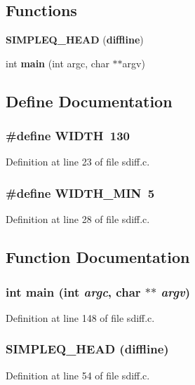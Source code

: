 \subsection*{Functions}
\begin{DoxyCompactItemize}
\item 
{\bf SIMPLEQ\_\-HEAD} ({\bf diffline})
\item 
int {\bf main} (int argc, char $\ast$$\ast$argv)
\end{DoxyCompactItemize}


\subsection{Define Documentation}
\subsubsection[{WIDTH}]{\setlength{\rightskip}{0pt plus 5cm}\#define WIDTH~130}\label{sdiff_8c_a241aeeb764887ae5e3de58b98f04b16d}


Definition at line 23 of file sdiff.c.

\subsubsection[{WIDTH\_\-MIN}]{\setlength{\rightskip}{0pt plus 5cm}\#define WIDTH\_\-MIN~5}\label{sdiff_8c_a54b8a4e8ef50fc50e77a641d62133a26}


Definition at line 28 of file sdiff.c.



\subsection{Function Documentation}
\subsubsection[{main}]{\setlength{\rightskip}{0pt plus 5cm}int main (int {\em argc}, \/  char $\ast$$\ast$ {\em argv})}\label{sdiff_8c_a3c04138a5bfe5d72780bb7e82a18e627}


Definition at line 148 of file sdiff.c.

\subsubsection[{SIMPLEQ\_\-HEAD}]{\setlength{\rightskip}{0pt plus 5cm}SIMPLEQ\_\-HEAD ({\bf diffline})}\label{sdiff_8c_aeeb44b4fa4422a49f82ce255e145fa17}


Definition at line 54 of file sdiff.c.

